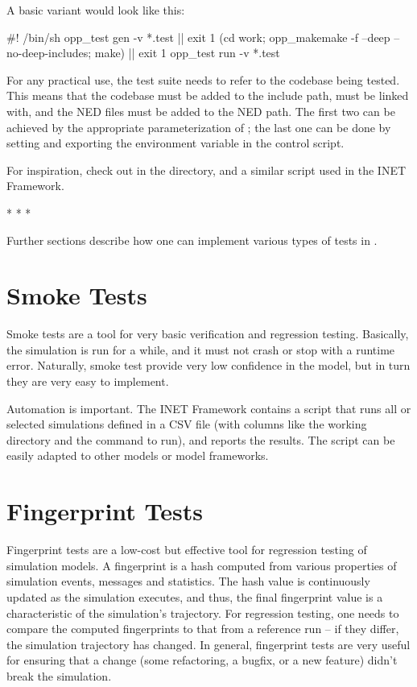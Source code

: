 A basic variant would look like this:

\begin{filelisting}
#! /bin/sh
opp_test gen -v *.test || exit 1
(cd work; opp_makemake -f --deep --no-deep-includes; make) || exit 1
opp_test run -v *.test
\end{filelisting}

For any practical use, the test suite needs to refer to the codebase being
tested. This means that the codebase must be added to the include path,
must be linked with, and the NED files must be added to the NED path. The
first two can be achieved by the appropriate parameterization of
; the last one can be done by setting and exporting
the  environment variable in the control script.

For inspiration, check out  in the 
directory, and a similar script used in the INET Framework.

\bigskip
\begin{center}
* * *
\end{center}
\bigskip

Further sections describe how one can implement various types of tests in
{\opp}.

\section{Smoke Tests}
\label{sec:testing:smoke-tests}

Smoke tests are a tool for very basic verification and regression testing.
Basically, the simulation is run for a while, and it must not crash or stop
with a runtime error. Naturally, smoke test provide very low confidence in
the model, but in turn they are very easy to implement.

Automation is important. The INET Framework contains a script that runs all
or selected simulations defined in a CSV file (with columns like the working
directory and the command to run), and reports the results. The script can
be easily adapted to other models or model frameworks.


\section{Fingerprint Tests}
\label{sec:testing:fingerprint-tests}

Fingerprint tests are a low-cost but effective tool for regression testing
of simulation models. A fingerprint is a hash computed from various properties
of simulation events, messages and statistics. The hash value is continuously
updated as the simulation executes, and thus, the final fingerprint value is
a characteristic of the simulation's trajectory. For regression testing, one
needs to compare the computed fingerprints to that from a reference run --
if they differ, the simulation trajectory has changed. In general, fingerprint
tests are very useful for ensuring that a change (some refactoring, a bugfix,
or a new feature) didn't break the simulation.

